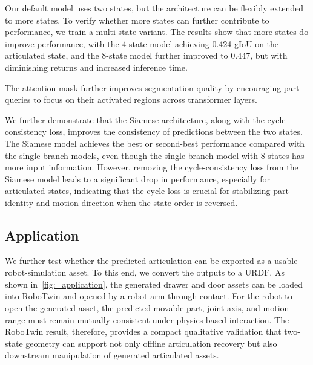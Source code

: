 Our default model uses two states, but the architecture can be flexibly extended to more states.
To verify whether more states can further contribute to performance,
we train a multi-state variant.
The results show that more states do improve performance,
with the 4-state model achieving 0.424 gIoU on the articulated state,
and the 8-state model further improved to 0.447,
but with diminishing returns and increased inference time.

The attention mask further improves segmentation quality by encouraging part queries to focus on their activated regions across transformer layers.

We further demonstrate that the Siamese architecture, along with the cycle-consistency loss, improves the consistency of predictions between the two states.
The Siamese model achieves the best or second-best performance compared with the single-branch models,
even though the single-branch model with 8 states has more input information.
However, removing the cycle-consistency loss from the Siamese model leads to a significant drop in performance, especially for articulated states, indicating that the cycle loss is crucial for stabilizing part identity and motion direction when the state order is reversed.



\subsection{Application}
\label{sec:exp_application}

We further test whether the predicted articulation can be exported as a usable robot-simulation asset.
To this end, we convert the outputs to a URDF.
As shown in~\cref{fig:_application}, the generated drawer and door assets can be loaded into RoboTwin and opened by a robot arm through contact.
For the robot to open the generated asset, the predicted movable part, joint axis, and motion range must remain mutually consistent under physics-based interaction.
The RoboTwin result, therefore, provides a compact qualitative validation that two-state geometry can support not only offline articulation recovery but also downstream manipulation of generated articulated assets.
